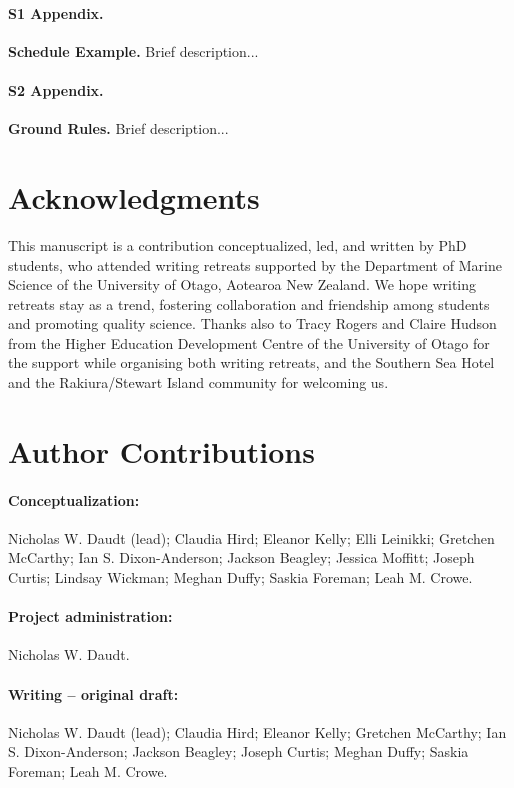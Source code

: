 \documentclass[10pt,letterpaper]{article}
\begin{document}
\paragraph*{S1 Appendix.}
\label{S1_Appendix}
{\bf Schedule Example.} Brief description...

\paragraph*{S2 Appendix.}
\label{S2_Appendix}
{\bf Ground Rules.} Brief description...


\section*{Acknowledgments}
This manuscript is a contribution conceptualized, led, and written by PhD students, who attended writing retreats supported by the Department of Marine Science of the University of Otago, Aotearoa New Zealand. We hope writing retreats stay as a trend, fostering collaboration and friendship among students and promoting quality science. Thanks also to Tracy Rogers and Claire Hudson from the Higher Education Development Centre of the University of Otago for the support while organising both writing retreats, and the Southern Sea Hotel and the Rakiura/Stewart Island community for welcoming us. 

\section*{Author Contributions}

\paragraph*{Conceptualization:} Nicholas W. Daudt (lead); Claudia Hird; Eleanor Kelly; Elli Leinikki; Gretchen McCarthy; Ian S. Dixon-Anderson; Jackson Beagley; Jessica Moffitt; Joseph Curtis; Lindsay Wickman; Meghan Duffy; Saskia Foreman; Leah M. Crowe.

\paragraph*{Project administration:} Nicholas W. Daudt.

\paragraph*{Writing – original draft:}  Nicholas W. Daudt (lead); Claudia Hird; Eleanor Kelly; Gretchen McCarthy; Ian S. Dixon-Anderson; Jackson Beagley; Joseph Curtis; Meghan Duffy; Saskia Foreman; Leah M. Crowe.
\end{document}
